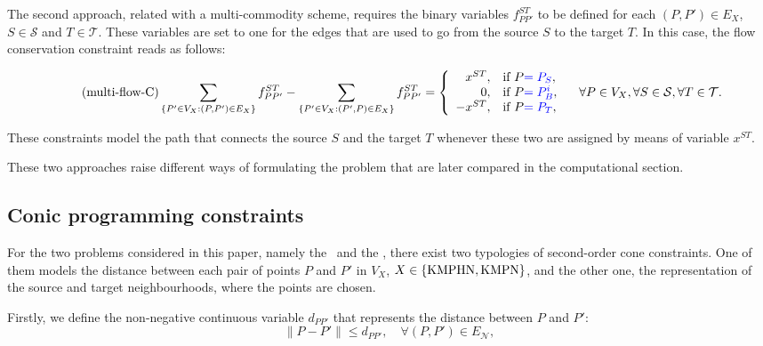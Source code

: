 \documentclass[a4paper,  review, authoryear, 1p.]{elsarticle}
\newcommand{\KMPHN}{{\sf{H-KMPHN}}}
\newcommand{\KMPN}{{\sf{H-KMPN}\xspace }}
\newcommand{\EN}{{E^{}_{\mathcal N}}}
\newcommand{\CV}[1]{{\color{blue}#1}}
\begin{document}
	The second approach, related with a multi-commodity scheme, requires the binary variables $f_{PP'}^{ST}$  to be defined for each $(P, P')\in E_X$, $S\in\mathcal S$ and $T\in\mathcal T$. These variables are set to one for the edges that are used to go from the source $S$ to the target $T$. In this case, the flow conservation constraint reads as follows:
	
	{\small
	\begin{equation}\label{eq:multi-flowC}\tag{multi-flow-C}
		\sum_{\{P'\in V_X:(P,P')\in E_X\}}f_{PP'}^{ST}-\sum_{\{P'\in V_X:(P',P)\in E_X\}}f_{PP'}^{ST} =\left\{
		\begin{array}{rl} 
			x^{ST}, & \text{if } P\CV{=P_S}, \\
			0, & \text{if } P\CV{=P_B^i}, \\
			-x^{ST}, & \text{if }P\CV{=P_T},
		\end{array}
		\right.\quad\forall P\in V_X,\forall S\in\mathcal S,\forall T\in\mathcal T.
	\end{equation}}

	These constraints model the path that connects the source $S$ and the target $T$ whenever these two are assigned by means of variable $x^{ST}$.
	
	These two approaches raise different ways of formulating the problem that are later compared in the computational section.
	
	
	\newcommand{\xvar}[2]{x(#1#2)}
	
	
	\subsection{Conic programming constraints}\label{subsection:conic}
	For the two problems considered in this paper, namely the \KMPHN \ and the \KMPN, there exist two typologies of second-order cone constraints. One of them models the distance between each pair of points $P$ and $P'$ in $V_X$, $X\in\{\rm KMPHN, \rm KMPN\}$, and the other one, the representation of the source and target neighbourhoods, where the points are chosen.
	
	\newcommand{\dvar}[2]{d_{#1#2}}
	
	Firstly, we define the non-negative continuous variable $\dvar{P}{P'}$ that represents the distance between $P$ and $P'$:
	\begin{equation*}\tag{$d$-C}\label{eq:dC}
		\|P - P'\|\leq \dvar{P}{P'},\quad\forall (P,P')\in \EN,
	\end{equation*}
	
\end{document}
